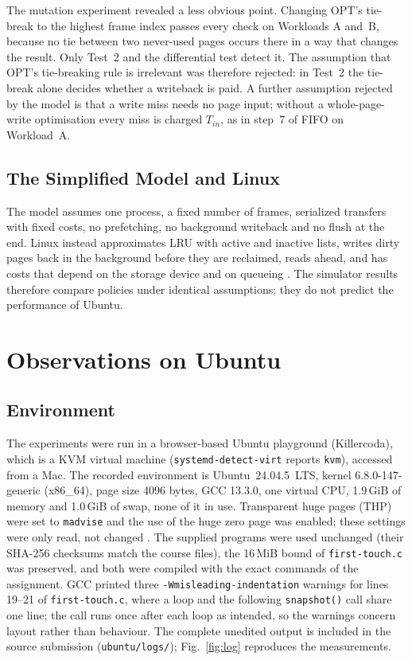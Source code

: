 \documentclass[conference,a4paper]{IEEEtran}
\newcommand{\code}[1]{\texttt{#1}}
\begin{document}
The mutation experiment revealed a less obvious point. Changing OPT's tie-break to the highest frame index passes every check on Workloads A and~B, because no tie between two never-used pages occurs there in a way that changes the result. Only Test~2 and the differential test detect it. The assumption that OPT's tie-breaking rule is irrelevant was therefore rejected: in Test~2 the tie-break alone decides whether a writeback is paid. A further assumption rejected by the model is that a write miss needs no page input; without a whole-page-write optimisation every miss is charged $T_{in}$, as in step~7 of FIFO on Workload~A.

\subsection{The Simplified Model and Linux}
The model assumes one process, a fixed number of frames, serialized transfers with fixed costs, no prefetching, no background writeback and no flush at the end. Linux instead approximates LRU with active and inactive lists, writes dirty pages back in the background before they are reclaimed, reads ahead, and has costs that depend on the storage device and on queueing \cite{silberschatz,ostep}. The simulator results therefore compare policies under identical assumptions; they do not predict the performance of Ubuntu.

\section{Observations on Ubuntu}\label{sec:ubuntu}
\subsection{Environment}
The experiments were run in a browser-based Ubuntu playground (Killercoda), which is a KVM virtual machine (\code{systemd-detect-virt} reports \code{kvm}), accessed from a Mac. The recorded environment is Ubuntu~24.04.5~LTS, kernel 6.8.0-147-generic (x86\_64), page size 4096 bytes, GCC 13.3.0, one virtual CPU, 1.9\,GiB of memory and 1.0\,GiB of swap, none of it in use. Transparent huge pages (THP) were set to \code{madvise} and the use of the huge zero page was enabled; these settings were only read, not changed \cite{thp}. The supplied programs \cite{week6} were used unchanged (their SHA-256 checksums match the course files), the 16\,MiB bound of \code{first-touch.c} was preserved, and both were compiled with the exact commands of the assignment. GCC printed three \code{-Wmisleading-indentation} warnings for lines 19--21 of \code{first-touch.c}, where a loop and the following \code{snapshot()} call share one line; the call runs once after each loop as intended, so the warnings concern layout rather than behaviour. The complete unedited output is included in the source submission (\code{ubuntu/logs/}); Fig.~\ref{fig:log} reproduces the measurements.
\end{document}
